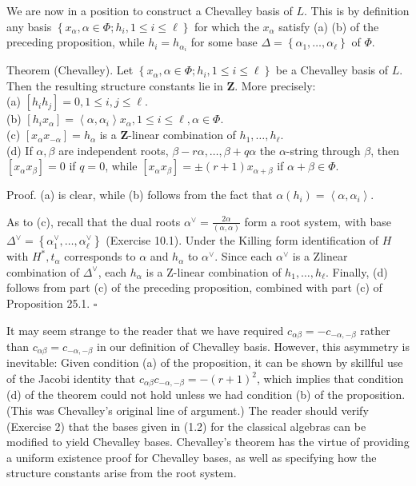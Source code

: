 \documentclass[10pt]{article}
\begin{document}
We are now in a position to construct a Chevalley basis of $L$. This is by definition any basis $\left\{x_{\alpha}, \alpha \in \Phi ; h_{i}, 1 \leq i \leq \ell\right\}$ for which the $x_{\alpha}$ satisfy (a) (b) of the preceding proposition, while $h_{i}=h_{\alpha_{i}}$ for some base $\Delta=\left\{\alpha_{1}, \ldots, \alpha_{\ell}\right\}$ of $\Phi$.

Theorem (Chevalley). Let $\left\{x_{\alpha}, \alpha \in \Phi ; h_{i}, 1 \leq i \leq \ell\right\}$ be a Chevalley basis of $L$. Then the resulting structure constants lie in $\mathbf{Z}$. More precisely:\\
(a) $\left[h_{i} h_{j}\right]=0,1 \leq i, j \leq \ell$.\\
(b) $\left[h_{i} x_{\alpha}\right]=\left\langle\alpha, \alpha_{i}\right\rangle x_{\alpha}, 1 \leq i \leq \ell, \alpha \in \Phi$.\\
(c) $\left[x_{\alpha} x_{-\alpha}\right]=h_{\alpha}$ is a $\mathbf{Z}$-linear combination of $h_{1}, \ldots, h_{\ell}$.\\
(d) If $\alpha, \beta$ are independent roots, $\beta-r \alpha, \ldots, \beta+q \alpha$ the $\alpha$-string through $\beta$, then $\left[x_{\alpha} x_{\beta}\right]=0$ if $q=0$, while $\left[x_{\alpha} x_{\beta}\right]= \pm(r+1) x_{\alpha+\beta}$ if $\alpha+\beta \in \Phi$.

Proof. (a) is clear, while (b) follows from the fact that $\alpha\left(h_{i}\right)=\left\langle\alpha, \alpha_{i}\right\rangle$.

As to (c), recall that the dual roots $\alpha^{\vee}=\frac{2 \alpha}{(\alpha, \alpha)}$ form a root system, with base $\Delta^{\vee}=\left\{\alpha_{1}^{\vee}, \ldots, \alpha_{\ell}^{\vee}\right\}$ (Exercise 10.1). Under the Killing form identification of $H$ with $H^{*}, t_{\alpha}$ corresponds to $\alpha$ and $h_{\alpha}$ to $\alpha^{\vee}$. Since each $\alpha^{\vee}$ is a Zlinear combination of $\Delta^{\vee}$, each $h_{\alpha}$ is a Z-linear combination of $h_{1}, \ldots, h_{\ell}$. Finally, (d) follows from part (c) of the preceding proposition, combined with part (c) of Proposition 25.1. $\square$

It may seem strange to the reader that we have required $c_{\alpha \beta}=-c_{-\alpha,-\beta}$ rather than $c_{\alpha \beta}=c_{-\alpha,-\beta}$ in our definition of Chevalley basis. However, this asymmetry is inevitable: Given condition (a) of the proposition, it can be shown by skillful use of the Jacobi identity that $c_{\alpha \beta} c_{-\alpha,-\beta}=-(r+1)^{2}$, which implies that condition (d) of the theorem could not hold unless we had condition (b) of the proposition. (This was Chevalley's original line of argument.) The reader should verify (Exercise 2) that the bases given in (1.2) for the classical algebras can be modified to yield Chevalley bases. Chevalley's theorem has the virtue of providing a uniform existence proof for Chevalley bases, as well as specifying how the structure constants arise from the root system.
\end{document}
